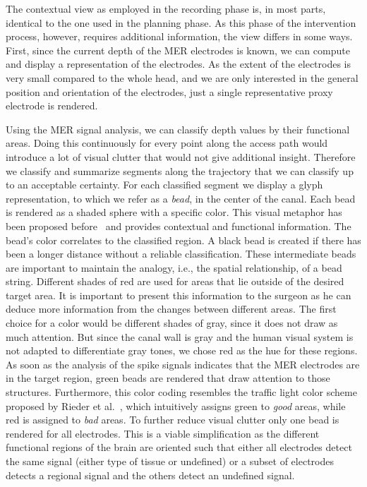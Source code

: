 \documentclass[review]{vgtc}                 %
\begin{document}
The contextual view as employed in the recording phase is, in most parts, identical to the one used in the planning phase. As this phase of the intervention process, however, requires additional information, the view differs in some ways. First, since the current depth of the MER electrodes is known, we can compute and display a representation of the electrodes. As the extent of the electrodes is very small compared to the whole head, and we are only interested in the general position and orientation of the electrodes, just a single representative proxy electrode is rendered. 

Using the MER signal analysis, we can classify depth values by their functional areas. Doing this continuously for every point along the access path would introduce a lot of visual clutter that would not give additional insight. Therefore we classify and summarize segments along the trajectory that we can classify up to an acceptable certainty. For each classified segment we display a glyph representation, to which we refer as a \emph{bead}, in the center of the canal. Each bead is rendered as a shaded sphere with a specific color. This visual metaphor has been proposed before~\cite{Miocinovic2007,Haese2005} and provides contextual and functional information. The bead's color correlates to the classified region. A black bead is created if there has been a longer distance without a reliable classification. These intermediate beads are important to maintain the analogy, i.e., the spatial relationship, of a bead string. Different shades of red are used for areas that lie outside of the desired target area. It is important to present this information to the surgeon as he can deduce more information from the changes between different areas. The first choice for a color would be different shades of gray, since it does not draw as much attention. But since the canal wall is gray and the human visual system is not adapted to differentiate gray tones, we chose red as the hue for these regions. As soon as the analysis of the spike signals indicates that the MER electrodes are in the target region, green beads are rendered that draw attention to those structures. Furthermore, this color coding resembles the traffic light color scheme proposed by Rieder et al.~\cite{Rieder2010}, which intuitively assigns green to {\it good} areas, while red is assigned to {\it bad} areas. To further reduce visual clutter only one bead is rendered for all electrodes. This is a viable simplification as the different functional regions of the brain are oriented such that either all electrodes detect the same signal (either type of tissue or undefined) or a subset of electrodes detects a regional signal and the others detect an undefined signal.
\end{document}
